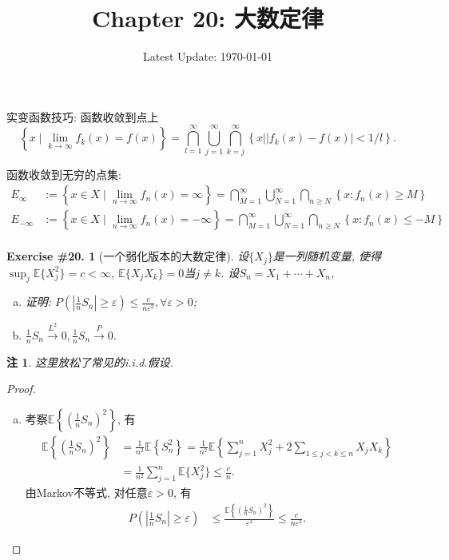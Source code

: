 \documentclass[UTF8, a4paper]{article}
\title{Chapter 20: 大数定律}
\author{}
\date{Latest Update: \today}
\newtheorem{exercise}{Exercise \#20.}
\newtheorem*{remark}{注}
\begin{document}
\maketitle

实变函数技巧: 函数收敛到点上
$$
\left\{x \mid \lim _{k \rightarrow \infty} f_k(x)=f(x)\right\}=\bigcap_{l=1}^{\infty} \bigcup_{j=1}^{\infty} \bigcap_{k=j}^{\infty}\left\{x| | f_k(x)-f(x) \mid<1 / l\right\} .
$$

函数收敛到无穷的点集:
$$
\begin{aligned}
    E_{\infty}&:= \left\{x \in X \mid \lim _{n \rightarrow \infty} f_n(x)=  \infty\right\}=\bigcap_{M=1}^{\infty} \bigcup_{N=1}^{\infty} \bigcap_{n \geq N}\left\{x: f_n(x) \geq M\right\}\\
    E_{-\infty}&:= \left\{x \in X \mid \lim _{n \rightarrow \infty} f_n(x)=  -\infty\right\}=\bigcap_{M=1}^{\infty} \bigcup_{N=1}^{\infty} \bigcap_{n \geq N}\left\{x: f_n(x) \leq -M\right\}\\
\end{aligned}
$$


\begin{framed}
\begin{exercise}[一个弱化版本的大数定律]
设\(\{X_j\}\)是一列随机变量, 使得\(\sup_j \mathbb{E}\{X_j^2\} = c < \infty\), \(\mathbb{E}\{X_j X_k\} = 0\)当\(j \neq k\).
设\(S_n = X_1 + \cdots + X_n\),  
\begin{enumerate}[a)]
    \item 证明: \(P\left(\left|\frac{1}{n}S_n\right| \geq \varepsilon\right) \leq \frac{c}{n\varepsilon^2}, \forall \varepsilon > 0\);
    \item \(\frac{1}{n}S_n \xrightarrow{L^2} 0, \frac{1}{n}S_n \xrightarrow{P} 0.\)
\end{enumerate}
\end{exercise}
\end{framed}
\begin{remark}
这里放松了常见的i.i.d.假设.
\end{remark}


\begin{proof}
\begin{enumerate}[a)]
\item 考察\(\mathbb{E}\left\{\left(\frac{1}{n}S_n\right)^2\right\}\), 有
\begin{align*}
    \mathbb{E}\left\{\left(\frac{1}{n}S_n\right)^2\right\} &= \frac{1}{n^2}\mathbb{E}\left\{S_n^2\right\} = \frac{1}{n^2}\mathbb{E}\left\{\sum_{j=1}^{n}X_j^2 + 2\sum_{1\leq j < k \leq n}X_jX_k\right\} \\
    &= \frac{1}{n^2}\sum_{j=1}^{n}\mathbb{E}\{X_j^2\} \leq \frac{c}{n}.
\end{align*}
由Markov不等式, 对任意\(\varepsilon > 0\), 有
\begin{align*}
    P\left(\left|\frac{1}{n}S_n\right| \geq \varepsilon\right) & \leq \frac{\mathbb{E}\left\{\left(\frac{1}{n}S_n\right)^2\right\}}{\varepsilon^2} \leq \frac{c}{n\varepsilon^2}.
\end{align*}
\end{enumerate}
\end{proof}
\end{document}
